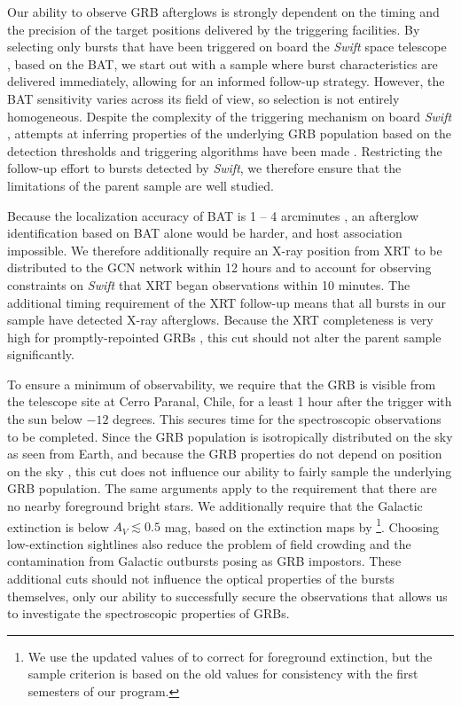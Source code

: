 \documentclass{aa}    %
\begin{document}
Our ability to observe GRB afterglows is strongly dependent on the timing and
the precision of the target positions delivered by the triggering facilities. By
selecting only bursts that have been triggered on board the \textit{Swift} space
telescope \citep{Gehrels2004}, based on the BAT, we start out with a sample
where burst characteristics are delivered immediately, allowing for an informed
follow-up strategy. However, the BAT sensitivity varies across its field of
view, so selection is not entirely homogeneous. Despite the complexity of the
triggering mechanism on board \textit{Swift} \citep{Band2006, Coward2013a},
attempts at inferring properties of the underlying GRB population based on the
detection thresholds and triggering algorithms have been made \citep{Lien2014,
	Graff2016}. Restricting the follow-up effort to bursts detected by
\textit{Swift}, we therefore ensure that the limitations of the parent sample
are well studied.

Because the localization accuracy of BAT is 1 -- 4 arcminutes
\citep{Barthelmy2005}, an afterglow identification based on BAT alone would be
harder, and  host association impossible. We therefore additionally require an
X-ray position from XRT to be distributed to the GCN network
\citep{Barthelmy2000} within 12 hours and to account for observing constraints
on \textit{Swift} that XRT began observations within 10 minutes. The additional
timing requirement of the XRT follow-up means that all bursts in our sample have
detected X-ray afterglows. Because the XRT completeness is very high for
promptly-repointed GRBs \citep{Burrows2007}, this cut should not alter the
parent sample significantly.

To ensure a minimum of observability, we require that the GRB is visible from
the telescope site at Cerro Paranal, Chile, for a least 1 hour after the trigger
with the sun below $-12$ degrees. This secures time for the spectroscopic
observations to be completed. Since the GRB population is isotropically
distributed on the sky as seen from Earth, and because the GRB properties do not
depend on position on the sky \citep{Meegan1992, Briggs1996, Ukwatta2016}, this
cut does not influence our ability to fairly sample the underlying GRB
population. The same arguments apply to the requirement that there are no nearby
foreground bright stars. We additionally require that the Galactic extinction is
below $A_V \lesssim 0.5$ mag, based on the extinction maps by
\citet{Schlegel1998}\footnote{We use the updated values of \citet{Schlafly2011}
	to correct for foreground extinction, but the sample criterion is based on the
	old \citet{Schlegel1998} values for consistency with the first semesters of our
	program.}. Choosing low-extinction sightlines also reduce the problem of field
crowding and the contamination from Galactic outbursts posing as GRB impostors.
These additional cuts should not influence the optical properties of the bursts
themselves, only our ability to successfully secure the observations that allows
us to investigate the spectroscopic properties of GRBs.
\end{document}
